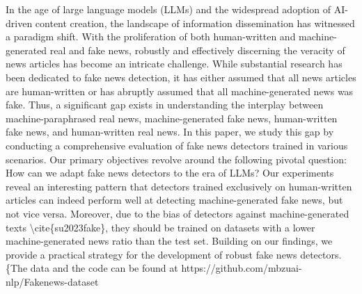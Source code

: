 In the age of large language models (LLMs) and the widespread adoption of AI-driven content creation, the landscape of information dissemination has witnessed a paradigm shift. With the proliferation of both human-written and machine-generated real and fake news, robustly and effectively discerning the veracity of news articles has become an intricate challenge. While substantial research has been dedicated to fake news detection, it has either assumed that all news articles are human-written or has abruptly assumed that all machine-generated news was fake. Thus, a significant gap exists in understanding the interplay between machine-paraphrased real news, machine-generated fake news, human-written fake news, and human-written real news. In this paper, we study this gap by conducting a comprehensive evaluation of fake news detectors trained in various scenarios. Our primary objectives revolve around the following pivotal question: How can we adapt fake news detectors to the era of LLMs? Our experiments reveal an interesting pattern that detectors trained exclusively on human-written articles can indeed perform well at detecting machine-generated fake news, but not vice versa. Moreover, due to the bias of detectors against machine-generated texts \textbackslash{}cite\{su2023fake\}, they should be trained on datasets with a lower machine-generated news ratio than the test set. Building on our findings, we provide a practical strategy for the development of robust fake news detectors. \{The data and the code can be found at https://github.com/mbzuai-nlp/Fakenews-dataset